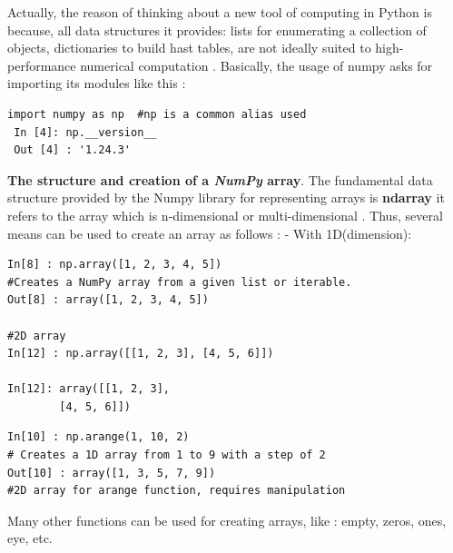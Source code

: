 \documentclass[12pt,a4paper, oneside]{book}
\begin{document}
 Actually, the reason of thinking about a new tool of computing in Python is because, all  data structures it provides: lists for enumerating a collection of objects, dictionaries to build hast tables, are not ideally suited to high-performance numerical computation \cite{van2011numpy}.\newline 
 Basically, the usage of numpy asks for importing its modules like this :  
 \begin{lstlisting}[style=stylejupyter]
 import numpy as np  #np is a common alias used  
 In [4]: np.__version__
 Out [4] : '1.24.3'
 \end{lstlisting} 
 \textbf{The structure and creation of a \textit{NumPy} array}. The fundamental data structure provided by the Numpy library for representing arrays is \textbf{ndarray} it refers to the array which is n-dimensional or multi-dimensional \cite{coursAnalyseDonne2}. Thus, several means can be used to create an array as follows  : \newline
 - With 1D(dimension):
 \begin{lstlisting}[style=stylejupyter]
In[8] : np.array([1, 2, 3, 4, 5])
#Creates a NumPy array from a given list or iterable.
Out[8] : array([1, 2, 3, 4, 5]) 

#2D array
In[12] : np.array([[1, 2, 3], [4, 5, 6]])

In[12]: array([[1, 2, 3],
		[4, 5, 6]])
 \end{lstlisting}
 \begin{lstlisting}[style=stylejupyter]
In[10] : np.arange(1, 10, 2)  
# Creates a 1D array from 1 to 9 with a step of 2
Out[10] : array([1, 3, 5, 7, 9]) 
#2D array for arange function, requires manipulation
 \end{lstlisting} 
  Many other functions can be used for creating arrays, like : empty, zeros, ones, eye, etc. \\
  
\end{document}
